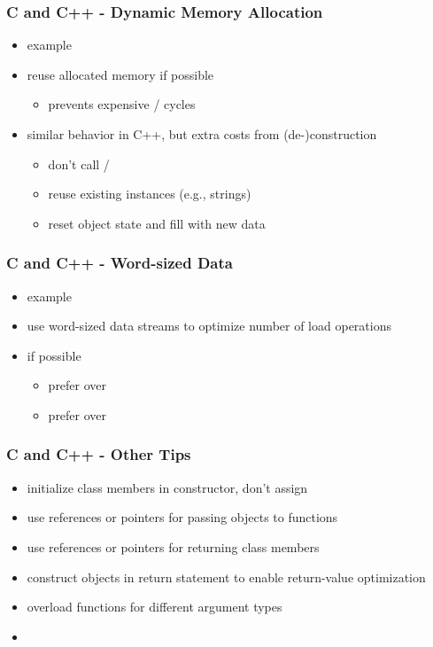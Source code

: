 \begin{frame}
 \frametitle{C and C++ - Dynamic Memory Allocation}
 \begin{itemize}
  \item example 
  \item reuse allocated memory if possible
  \begin{itemize}
   \item prevents expensive / cycles
  \end{itemize}
 \item similar behavior in C++, but extra costs from (de-)construction
  \begin{itemize}
   \item don't call /
   \item reuse existing instances (e.g., strings)
   \item reset object state and fill with new data
  \end{itemize}
 \end{itemize}
\end{frame}

\begin{frame}
 \frametitle{C and C++ - Word-sized Data}
 \begin{itemize}
  \item example 
  \item use word-sized data streams to optimize number of load operations
  \item if possible
  \begin{itemize}
   \item prefer  over 
   \item prefer  over 
  \end{itemize}
 \end{itemize}
\end{frame}

\begin{frame}
 \frametitle{C and C++ - Other Tips}
 \begin{itemize}
  \item initialize class members in constructor, don't assign
  \item use references or pointers for passing objects to functions
  \item use references or pointers for returning class members
  \item construct objects in return statement to enable return-value optimization
  \item overload functions for different argument types
 \end{itemize}
 \begin{itemize}
  \item {}
 \end{itemize}
\end{frame}

